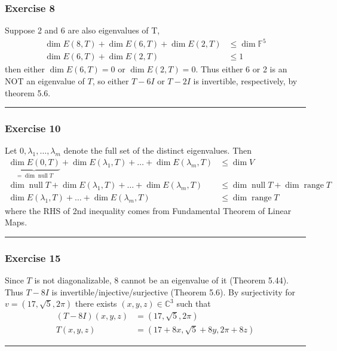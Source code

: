 \documentclass[12pt, letterpaper]{scrartcl}
\newcommand{\C}{\mathbb{C}}
\newcommand{\F}{\mathbb{F}}
\DeclareMathOperator{\Null}{null}
\DeclareMathOperator{\Range}{range}
\begin{document}
\subsubsection*{Exercise 8}
Suppose 2 and 6 are also eigenvalues of T,
\begin{align*}
    \dim E(8, T) + \dim E(6, T) + \dim E(2, T) &\leq \dim \F^5\\
    \dim E(6, T) + \dim E(2, T) &\leq 1
\end{align*}
then either $\dim E(6, T)=0$ or $\dim E(2, T)=0$. Thus either 6 or 2 is an NOT an eigenvalue of $T$, so either $T-6I$ or $T-2I$ is invertible, respectively, by theorem 5.6.
\vskip1mm\hrule


\subsubsection*{Exercise 10}
Let $0,\lambda_1,\dots,\lambda_m$ denote the full set of the distinct eigenvalues. Then 
\begin{align*}
    \underbrace{\dim E(0,T)}_{=\dim\Null T} + \dim E(\lambda_1, T) + \dots + \dim E(\lambda_m,T) &\leq \dim V\\
    \dim\Null T + \dim E(\lambda_1, T) + \dots + \dim E(\lambda_m,T) &\leq \dim\Null T + \dim\Range T\\
    \dim E(\lambda_1, T) + \dots + \dim E(\lambda_m,T) &\leq \dim\Range T
\end{align*}
where the RHS of 2nd inequality comes from Fundamental Theorem of Linear Maps.
\vskip1mm\hrule


\subsubsection*{Exercise 15}
Since $T$ is not diagonalizable, 8 cannot be an eigenvalue of it (Theorem 5.44). Thus $T-8I$ is invertible/injective/surjective (Theorem 5.6). By surjectivity for $v=(17, \sqrt{5}, 2\pi)$ there exists $(x,y,z)\in\C^3$ such that
\begin{align*}
    (T-8I)(x,y,z)&=(17, \sqrt{5}, 2\pi)\\
    T(x,y,z)&=(17+8x, \sqrt{5}+8y, 2\pi+8z)
\end{align*}
\vskip1mm\hrule
\end{document}
